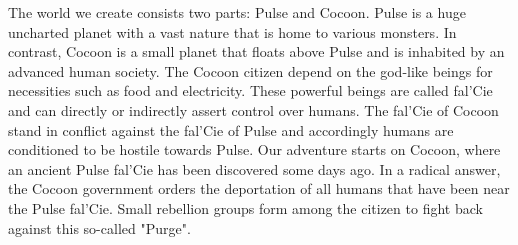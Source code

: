 \vspace{0.8cm}

{
	The world we create consists two parts: Pulse and Cocoon.
	Pulse is a huge uncharted planet with a vast nature that is home to various monsters.
	In contrast, Cocoon is a small planet that floats above Pulse and is inhabited by an advanced human society.
	The Cocoon citizen depend on the god-like beings for necessities such as food and electricity.
	These powerful beings are called fal'Cie and can directly or indirectly assert control over humans.
	The fal'Cie of Cocoon stand in conflict against the fal'Cie of Pulse and accordingly humans are conditioned to be hostile towards Pulse.		
	Our adventure starts on Cocoon, where an ancient Pulse fal'Cie has been discovered some days ago.
	In a radical answer, the Cocoon government orders the deportation of all humans that have been near the Pulse fal'Cie.
	Small rebellion groups form among the citizen to fight back against this so-called "Purge".
}

\pagebreak






